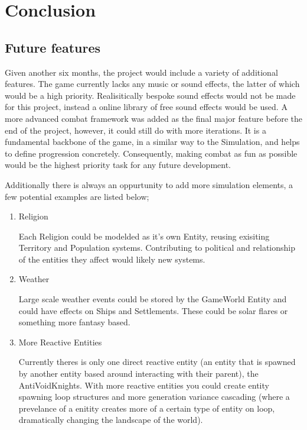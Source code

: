 \documentclass{report}
\begin{document}
\chapter{Conclusion}

\section{Future features}

Given another six months, the project would include a variety of additional features. The game currently lacks any music or sound effects, the latter of which would be a high priority. Realisitically bespoke sound effects would not be made for this project, instead a online library of free sound effects would be used. A more advanced combat framework was added as the final major feature before the end of the project, however, it could still do with more iterations. It is a fundamental backbone of the game, in a similar way to the Simulation, and helps to define progression concretely. Consequently, making combat as fun as possible would be the highest priority task for any future development.

Additionally there is always an oppurtunity to add more simulation elements, a few potential examples are listed below;

\begin{enumerate}

	\item	Religion

Each Religion could be modelded as it's own Entity, reusing exisiting Territory and Population systems. Contributing to political and relationship of the entities they affect would likely new systems.
 
	\item Weather

Large scale weather events could be stored by the GameWorld Entity and could have effects on Ships and Settlements. These could be solar flares or something more fantasy based.

	\item More Reactive Entities

Currently theres is only one direct reactive entity (an entity that is spawned by another entity based around interacting with their parent), the AntiVoidKnights. With more reactive entities you could create entity spawning loop structures and more generation variance cascading (where a prevelance of a enitity creates more of a certain type of entity on loop, dramatically changing the landscape of the world).

\end{enumerate}
\end{document}
